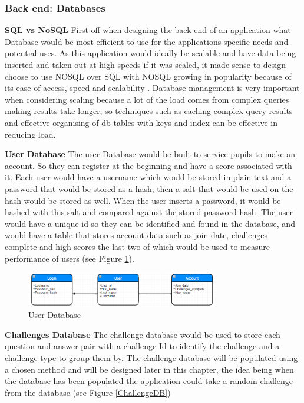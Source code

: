 \documentclass[12pt,a4paper]{article}
\begin{document}
\subsubsection{Back end: Databases} 
\textbf{SQL vs NoSQL}   
First off when designing the back end of an application what Database would be most efficient to use for the applications specific needs and potential uses. As this application would ideally be scalable and have data being inserted and taken out at high speeds if it was scaled, it made sense to design choose to use NOSQL over SQL with NOSQL growing in popularity because of its ease of access, speed and scalability \cite{li2013performance}. Database management is very important when considering scaling because a lot of the load comes from complex queries making results take longer, so techniques such as caching complex query results and effective organising of db tables with keys and index can be effective in reducing load.
 

\textbf{User Database}   
The user Database would be built to service pupils to make an account. So they can register at the beginning and have a score associated with it. Each user would have a username which would be stored in plain text and a password that would be stored as a hash, then a salt that would be used on the hash would be stored as well. When the user inserts a password, it would be hashed with this salt and compared against the stored password hash. The user would have a unique id so they can be identified and found in the database, and would have a table that stores account data such as join date, challenges complete and high scores the last two of which would be used to measure performance of users (see Figure \ref{UserDB}).

\begin{figure}[!ht]
    \centering
    \includegraphics[width=0.75\textwidth]{Figs/User_Db.PNG} 
    \caption{User Database} 
    \label{UserDB}
\end{figure}   

\textbf{Challenges Database}   
The challenge database would be used to store each question and answer pair with a challenge Id to identify the challenge and a challenge type to group them by. The challenge database will be populated using a chosen method and will be designed later in this chapter, the idea being when the database has been populated the application could take a random challenge from the database (see Figure \ref{ChallengeDB})
\end{document}
